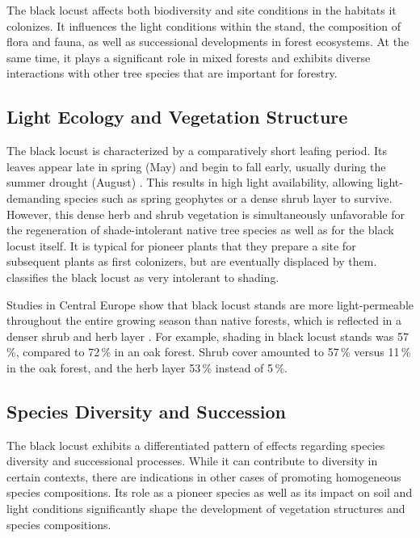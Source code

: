 The black locust affects both biodiversity and site conditions in the habitats it colonizes. It influences the light conditions within the stand, the composition of flora and fauna, as well as successional developments in forest ecosystems. At the same time, it plays a significant role in mixed forests and exhibits diverse interactions with other tree species that are important for forestry.

\subsection{Light Ecology and Vegetation Structure}

The black locust is characterized by a comparatively short leafing period. Its leaves appear late in spring (May) and begin to fall early, usually during the summer drought (August) \citep{vitkova2017robinie}. This results in high light availability, allowing light-demanding species such as spring geophytes or a dense shrub layer to survive. However, this dense herb and shrub vegetation is simultaneously unfavorable for the regeneration of shade-intolerant native tree species as well as for the black locust itself. It is typical for pioneer plants that they prepare a site for subsequent plants as first colonizers, but are eventually displaced by them. \citet{baker1949schattentoleranz} classifies the black locust as very intolerant to shading.

Studies in Central Europe show that black locust stands are more light-permeable throughout the entire growing season than native forests, which is reflected in a denser shrub and herb layer \citep{hanzelka2015robinie}. For example, shading in black locust stands was 57\,\%, compared to 72\,\% in an oak forest. Shrub cover amounted to 57\,\% versus 11\,\% in the oak forest, and the herb layer 53\,\% instead of 5\,\%.

\subsection{Species Diversity and Succession}

The black locust exhibits a differentiated pattern of effects regarding species diversity and successional processes. While it can contribute to diversity in certain contexts, there are indications in other cases of promoting homogeneous species compositions. Its role as a pioneer species as well as its impact on soil and light conditions significantly shape the development of vegetation structures and species compositions.

